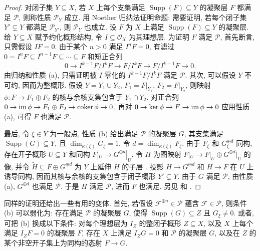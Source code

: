 \begin{proof}
对闭子集 $Y\subseteq X$, 若 $X$ 上每个支集满足 $\operatorname{Supp}(F)\subseteq Y$ 的凝聚层 $F$ 都满足 $\mathcal P$, 则称性质 $\mathcal P_Y$ 成立. 用 Noether 归纳法证明命题: 需要证明, 若每个闭子集 $Y'\subsetneq Y$ 都满足 $\mathcal P_{Y'}$, 则 $\mathcal P_Y$ 也成立. 设 $F$ 为 $X$ 上满足 $\operatorname{Supp}(F)\subseteq Y$ 的凝聚层. 给 $Y\subseteq X$ 赋予约化概形结构, 令 $I\subseteq\mathcal O_X$ 为其理想层. 为证明 $F$ 满足 $\mathcal P$, 首先断言, 只需假设 $IF=0$. 由于某个 $n>0$ 满足 $I^nF=0$, 有滤过 $0=I^nF\subseteq I^{n-1}F\subseteq\cdots\subseteq F$ 和短正合列
\[
0\longrightarrow I^{k-1}F/I^kF\longrightarrow F/I^kF\longrightarrow F/I^{k-1}F\longrightarrow0.
\]
由归纳和性质 (a), 只需证明被 $I$ 零化的 $I^{k-1}F/I^kF$ 满足 $\mathcal P$. 其次, 可以假设 $Y$ 不可约, 因而为整概形. 假设 $Y=Y_1\cup Y_2$, $F_1=F|_{Y_1}$, $F_2=F|_{Y_2}$, 则映射 $\phi:F\to F_1\oplus F_2$ 的核与余核支集包含于 $Y_1\cap Y_2$. 对正合列 $0\to\operatorname{im}\phi\to F_1\oplus F_2\to\operatorname{coker}\phi\to0$, 再对 $0\to\ker\phi\to F\to\operatorname{im}\phi\to0$ 应用性质 (a), 可得 $F$ 也满足 $\mathcal P$.

最后, 令 $\xi\in Y$ 为一般点, 性质 (b) 给出满足 $\mathcal P$ 的凝聚层 $G$, 其支集满足 $\operatorname{Supp}(G)\subseteq Y$, 且 $\dim_{\kappa(\xi)}G_\xi=1$. 令 $d=\dim_{\kappa(\xi)}F_\xi$. 由于 $F_\xi$ 和 $G_\xi^{\oplus d}$ 同构, 存在开子概形 $U\subseteq Y$ 和同构 $F|_U\to G^{\oplus d}|_U$. 令 $H$ 为图映射 $F|_U\to F|_U\oplus G^{\oplus d}|_U$ 的像, 并令 $\widetilde H\subseteq F\oplus G^{\oplus d}$ 为 $Y$ 上延伸 $H$ 的子层 \cite[习题 II.$5.15$]{Har77}. 投影 $H\to G^{\oplus d}$ 和 $H\to F$ 在 $U$ 上诱导同构, 因而其核与余核的支集包含于闭子概形 $Y'\subsetneq Y$. 由于 $G$ 满足 $\mathcal P$, 由性质 (a), $G^{\oplus d}$ 也满足 $\mathcal P$. 于是 $H$ 满足 $\mathcal P$, 进而 $F$ 也满足. 另见 \cite[III$_1$.$3.1.2$]{EGA} 和 \cite[Tag 01YI]{SP}.
\end{proof}
\begin{remark}\label{src:A.5.2}
同样的证明还给出一些有用的变体. 首先, 若假设 $\mathcal F^{\oplus n}\in\mathcal P$ 蕴含 $\mathcal F\in\mathcal P$, 则条件 (b) 可以弱化为: 存在满足 $\mathcal P$ 的凝聚层 $G$, 使得 $\operatorname{Supp}(G)\subseteq Z$ 且 $G_\xi\neq0$. 或者, 可把 (b) 换成以下条件: 对每个理想层为 $I_Z$ 的整闭子概形 $Z\subseteq X$, 以及 $X$ 上每个满足 $I_ZF=0$ 的凝聚层 $F$, 存在 $X$ 上满足 $I_ZG=0$ 和 $\mathcal P$ 的凝聚层 $G$, 以及在 $Z$ 的某个非空开子集上为同构的态射 $F\to G$.
\end{remark}

